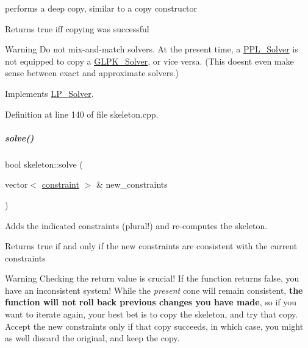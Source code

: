 performs a deep copy, similar to a copy constructor 

\begin{DoxyReturn}{Returns}
{\ttfamily true} iff copying was successful 
\end{DoxyReturn}
\begin{DoxyWarning}{Warning}
Do not mix-\/and-\/match solvers. At the present time, a \hyperlink{group___c_l_s_solvers_class_p_p_l___solver}{P\+P\+L\+\_\+\+Solver} is not equipped to copy a \hyperlink{group___c_l_s_solvers_class_g_l_p_k___solver}{G\+L\+P\+K\+\_\+\+Solver}, or vice versa. (This doesn\textquotesingle{}t even make sense between exact and approximate solvers.) 
\end{DoxyWarning}


Implements \hyperlink{group___c_l_s_solvers_a442ad4ad67ee2feff0df49e9201d61ca}{L\+P\+\_\+\+Solver}.



Definition at line 140 of file skeleton.\+cpp.

\mbox{\label{group___c_l_s_solvers_ac366952c2b0908159255916a1e37f9b3}} 
\subparagraph{\texorpdfstring{solve()}{solve()}\hspace{0.1cm}{\footnotesize\ttfamily [1/2]}}
{\footnotesize\ttfamily bool skeleton\+::solve (\begin{DoxyParamCaption}\item[{vector$<$ \hyperlink{group___c_l_s_solvers_classconstraint}{constraint} $>$ \&}]{new\+\_\+constraints }\end{DoxyParamCaption})\hspace{0.3cm}{\ttfamily [virtual]}}



Adds the indicated constraints (plural!) and re-\/computes the skeleton. 

\begin{DoxyReturn}{Returns}
{\ttfamily true} if and only if the new constraints are consistent with the current constraints
\end{DoxyReturn}
\begin{DoxyWarning}{Warning}
Checking the return value is crucial! If the function returns {\ttfamily false}, you have an inconsistent system! While the {\itshape present} cone will remain consistent, {\bfseries the function will not roll back previous changes you have made}, so if you want to iterate again, your best bet is to copy the skeleton, and try that copy. Accept the new constraints only if that copy succeeds, in which case, you might as well discard the original, and keep the copy. 
\end{DoxyWarning}


